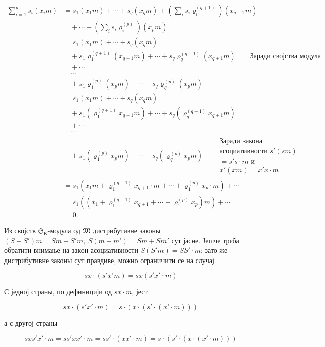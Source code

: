 \documentclass[11pt]{article}
\begin{document}
\[
\begin{aligned}
\sum_{i=1}^{p}s_i(x_i m)
&=s_1(x_1m)+\cdots+s_q(x_qm)
  +\left(\sum_i s_i\varrho_i^{(q+1)}\right)(x_{q+1}m)\\
&\quad+\cdots+\left(\sum_i s_i\varrho_i^{(p)}\right)(x_pm)\\
&=s_1(x_1m)+\cdots+s_q(x_qm)\\
&\quad+s_1\varrho_1^{(q+1)}(x_{q+1}m)+\cdots+s_q\varrho_q^{(q+1)}(x_{q+1}m)
  \qquad\text{Заради својства модула}\\
&\quad+\cdots\\
&\quad\cdots\\
&\quad+s_1\varrho_1^{(p)}(x_pm)+\cdots+s_q\varrho_q^{(p)}(x_pm)\\
&=s_1(x_1m)+\cdots+s_q(x_qm)\\
&\quad+s_1(\varrho_1^{(q+1)}x_{q+1}m)+\cdots+s_q(\varrho_q^{(q+1)}x_{q+1}m)\\
&\quad+\cdots\\
&\quad\cdots\\
&\quad+s_1(\varrho_1^{(p)}x_pm)+\cdots+s_q(\varrho_q^{(p)}x_pm)
  \qquad\begin{gathered}\text{Заради закона}\\ \text{асоциативности }s'(sm)\\ =s's\cdot m\text{ и}\\ x'(xm)=x'x\cdot m\end{gathered}\\
&=s_1\left(x_1m+\varrho_1^{(q+1)}x_{q+1}\cdot m+\cdots+\varrho_1^{(p)}x_p\cdot m\right)+\cdots\\
&=s_1\left(\left(x_1+\varrho_1^{(q+1)}x_{q+1}+\cdots+\varrho_1^{(p)}x_p\right)m\right)+\cdots\\
&=0.
\end{aligned}
\]


Из својств \(\mathfrak S_{\mathsf K}\)-модула од \(\mathfrak M\) дистрибутивне законы \((S+S')m=Sm+S'm,\ S(m+m')=Sm+Sm'\) сут јасне. Јешче трєба обратити внимање на закон асоциативности \(S(S'm)=SS'\cdot m\); зато же дистрибутивне законы сут правдиве, можно ограничити се на случај

\[
sx\cdot(s'x' m)=sx(s'x'\cdot m)
\]

С једној страны, по дефиницији од \(sx\cdot m\), јест

\[
sx\cdot(s'x'\cdot m)=s\cdot(x\cdot(s'\cdot(x'\cdot m)))
\]

а с другој страны

\[
sx s'x'\cdot m=ss'xx'\cdot m=ss'\cdot(xx'\cdot m)
=s\cdot(s'\cdot(x\cdot(x'\cdot m)))
\]
\end{document}
